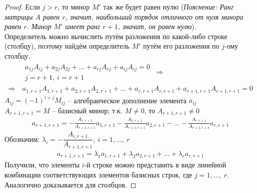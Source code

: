 \begin{proof}
	Если $j > r$, то минор  $M'$ так же будет равен нулю (\textit{Пояснение: Ранг матрицы $A$ равен $r$, значит, наибольший порядок отличного от нуля минора равен $r$. Минор $M'$ имеет ранг $r+1$, значит, он равен нулю}).\\
	Определитель можно вычислить путём разложения по какой-либо строке (столбцу), поэтому найдём определитель $M'$ путём его разложения по $j$-ому столбцу.
	\begin{align*}
		&\begin{array}{l}a_{1j}A_{ij} + a_{2j}A_{2j} + \ldots + a_{rj}A_{rj} + a_{ij}A_{ij} = 0\\
		j = r+1,\ i = r+1 \end{array}\ \Rightarrow \\
		\Rightarrow\ &a_{1, r+1}A_{1, r+1} + a_{2, r+1}A_{2, r+1} + \ldots + a_{r, r+1}A_{r, r+1} + a_{r+1, r+1}A_{r+1, r+1} = 0
	\end{align*}
		$A_{ij} = (-1)^{i+j} M_{ij}$ -- алгебраическое дополнение элемента $a_{ij}$\\
		$A_{r+1, r+1} = M$ -- базисный минор; т.к. $M\ne 0$, то $A_{r+1, r+1} \ne 0$
	\begin{align*}
		a_{r+1, r+1} = -\frac{A_{1, r+1}}{A_{r+1, r+1}}a_{1, r+1} - \frac{A_{2, r+1}}{A_{r+1, r+1}}a_{2, r+1} - \ldots - \frac{A_{r, r+1}}{A_{r+1, r+1}}a_{r, r+1}
	\end{align*}
	Обозначим:
	$\lambda_i = -\dfrac{A_{i, r+1}}{A_{r+1, r+1}},\ i=1,\ldots,\ r$
	\begin{gather*}
		a_{r+1, r+1} = \lambda_1 a_{1, r+1} + \lambda_2 a_{2, r+1} + \ldots + \lambda_r a_{r, r+1}
	\end{gather*}
	Получили, что элементы $i$-й строке можно представить в виде линейной комбинации соответствующих элементов базисных строк, где $j = 1, \ldots,\ r$.\\
	Аналогично доказывается для столбцов.
\end{proof}


